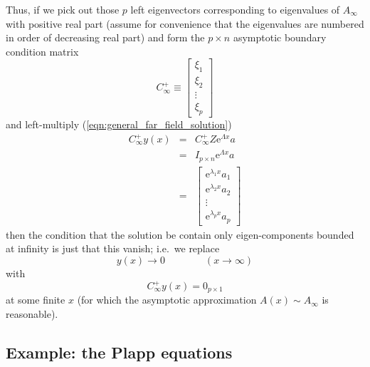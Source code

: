 \documentclass{article}
\begin{document}
Thus, if we pick out those $p$ left eigenvectors corresponding to
eigenvalues of $A_\infty$ with positive real part (assume for
convenience that the eigenvalues are numbered in order of decreasing
real part) and form the $p\times n$ asymptotic boundary condition
matrix
\begin{equation}
C_{\infty}^{+} \equiv \left[\begin{array}{c}
        \xi_1 \\
        \xi_2 \\
        \vdots \\
        \xi_p           \end{array}\right]
\end{equation}
and left-multiply (\ref{eqn:general_far_field_solution})
\begin{eqnarray}
  C_\infty^+ y(x) & = & C_\infty^+ Z \mathrm{e}^{\Lambda x} a 
  \label{eqn:ABC} \\
  & = & 
  I_{p\times n} %
  \mathrm{e}^{\Lambda x} a \\
  & = & 
  \left[
    \begin{array}{c}
      \mathrm{e}^{\lambda_1 x} a_1 \\
      \mathrm{e}^{\lambda_2 x} a_2\\
      \vdots \\
      \mathrm{e}^{\lambda_p x} a_p            
    \end{array}
  \right]
\end{eqnarray}
then the condition that the solution be contain only eigen-components
bounded at infinity is just that this vanish; i.e.\ we replace
\begin{equation}
y(x) \rightarrow 0 \qquad\qquad (x\rightarrow\infty)
\end{equation}
with
\begin{equation}
C_\infty^+ y(x) = 0_{p\times 1}
\end{equation}
at some finite $x$ (for which the asymptotic approximation $A(x)\sim
A_\infty$ is reasonable).  

\subsection{Example: the Plapp equations}
\end{document}
